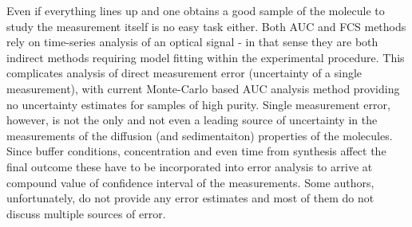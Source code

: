 \documentclass{doctoral}
\begin{document}
Even if everything lines up and one obtains a good sample of the molecule to study the measurement itself is no easy task either. Both AUC and FCS methods rely on time-series analysis of an optical signal - in that sense they are both indirect methods requiring model fitting within the experimental procedure. This complicates analysis of direct measurement error (uncertainty of a single measurement), with current Monte-Carlo based AUC analysis method providing no uncertainty estimates for samples of high purity. Single measurement error, however, is not the only and not even a leading source of uncertainty in the measurements of the diffusion (and sedimentaiton) properties of the molecules. Since buffer conditions, concentration and even time from synthesis\cite{Nag_2011} affect the final outcome these have to be incorporated into error analysis to arrive at compound value of confidence interval of the measurements. Some authors, unfortunately, do not provide any error estimates\cite{Poznar_2017,Khaymina_2007} and most of them do not discuss multiple sources of error.
\end{document}
